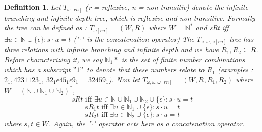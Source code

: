 \documentclass[12pt, a4paper]{scrartcl}
\newtheorem{definition}{Definition}[subsection]
\begin{document}
\begin{definition}
    Let $T_{\omega [rn]}$ (r = reflexive, n = non-transitiv) denote the infinite branching and infinite depth tree, which is reflexive and non-transitive.
    Formally the tree can be defined as : $T_{\omega [rn]} = (W, R)$ where $W = \mathbb{N}^*$ and sRt iff $\exists u \in \mathbb{N} \cup \{\epsilon\} : s \cdot u = t$ ("$\cdot$" is the concatenation operator) \newline \newline
    The $T_{\omega,\omega,\omega [rn]}$ tree has three relations with infinite branching and infinite depth and we have $R_1,R_2 \subseteq R$. Before characterizing it, we say
    $\mathbb{N}_{1}*$ is the set of finite number combinations which has a subscript $"1"$ to denote that these numbers relate to $R_1$  \newline 
    (examples : $2_{1}, 4231123_{1}$, $32_{1} \epsilon 45_{1} \epsilon 9_{1} = 32459_{1}$). \newline \newline
    Now let $T_{\omega,\omega,\omega [rn]} = (W, R, R_1, R_2 )$ where $W = (\mathbb{N} \cup \mathbb{N}_{1} \cup \mathbb{N}_{2})^*$, 
    $$sRt \mbox{ iff } \exists u \in \mathbb{N} \cup \mathbb{N}_{1} \cup \mathbb{N}_{2} \cup \{\epsilon\} : s \cdot u = t$$
    $$sR_1t \mbox { iff } \exists u \in \mathbb{N}_{1} \cup \{\epsilon\} : s \cdot u = t$$
    $$sR_2t \mbox { iff } \exists u \in \mathbb{N}_{2} \cup \{\epsilon\} : s \cdot u = t$$
    where $s,t \in W$. Again, the "$\cdot$" operator acts here as a concatenation operator.
        
\end{definition}
\end{document}
